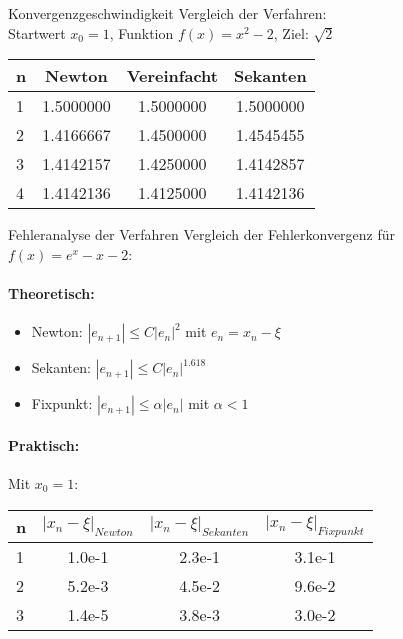 \begin{example2}{Konvergenzgeschwindigkeit} Vergleich der Verfahren:
    \vspace{1mm}\\
    Startwert $x_0 = 1$, Funktion $f(x) = x^2 - 2$, Ziel: $\sqrt{2}$
    \begin{center}
    \begin{tabular}{l|c|c|c}
    n & Newton & Vereinfacht & Sekanten \\\hline
    1 & 1.5000000 & 1.5000000 & 1.5000000\\
    2 & 1.4166667 & 1.4500000 & 1.4545455\\
    3 & 1.4142157 & 1.4250000 & 1.4142857\\
    4 & 1.4142136 & 1.4125000 & 1.4142136
    \end{tabular}
    \end{center}
\end{example2}



\begin{example2}{Fehleranalyse der Verfahren}
Vergleich der Fehlerkonvergenz für $f(x) = e^x - x - 2$:

\paragraph{Theoretisch:}
\begin{itemize}
    \item Newton: $|e_{n+1}| \leq C|e_n|^2$ mit $e_n = x_n - \xi$
    \item Sekanten: $|e_{n+1}| \leq C|e_n|^{1.618}$
    \item Fixpunkt: $|e_{n+1}| \leq \alpha|e_n|$ mit $\alpha < 1$
\end{itemize}

\paragraph{Praktisch:} Mit $x_0 = 1$:
\begin{center}
\begin{tabular}{l|c|c|c}
n & $|x_n-\xi|_{Newton}$ & $|x_n-\xi|_{Sekanten}$ & $|x_n-\xi|_{Fixpunkt}$ \\\hline
1 & 1.0e-1 & 2.3e-1 & 3.1e-1 \\
2 & 5.2e-3 & 4.5e-2 & 9.6e-2 \\
3 & 1.4e-5 & 3.8e-3 & 3.0e-2
\end{tabular}
\end{center}
\end{example2}



